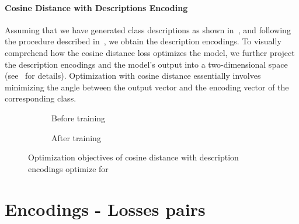 \paragraph{Cosine Distance with Descriptions Encoding} Assuming that we have generated class descriptions as shown in~, and following the procedure described in~, we obtain the description encodings.
To visually comprehend how the cosine distance loss optimizes the model, we further project the description encodings and the model's output into a two-dimensional space (see~ for details). Optimization with cosine distance essentially involves minimizing the angle between the output vector and the encoding vector of the corresponding class.
\begin{figure}[htbp] %
  \begin{subfigure}{0.45\textwidth}
    \caption{Before training}
    \label{fig:03/cd-desc-before}
  \end{subfigure}
  \begin{subfigure}{0.45\textwidth}
    \caption{After training}
    \label{fig:03/cd-desc-after}
  \end{subfigure}
  \caption{Optimization objectives of cosine distance with description encodings optimize for}
\end{figure}

\section{Encodings - Losses pairs}
\label{sec:encodings-losses-pairs}

